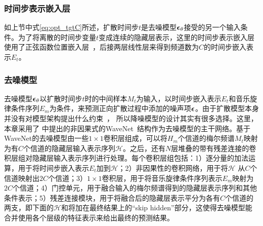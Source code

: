 \subsubsection{时间步表示嵌入层}
如上节中式\eqref{eq:opt_tgtC}所述，扩散时间步$t$是去噪模型${\boldsymbol{\epsilon}}_\theta$接受的另一个输入条件。为了将离散的时间步变量$t$变成连续的隐藏层表示，这里的时间步表示嵌入层使用了正弦函数位置嵌入层~\citep{vaswani2017attention}，后接两层线性层来得到频道数为$C$的时间步嵌入表示$E_t$。
\subsubsection{去噪模型}
去噪模型${\boldsymbol{\epsilon}}_\theta$以扩散时间步$t$时的中间样本$M_t$为输入，以时间步嵌入表示$E_t$和音乐旋律条件序列$E_m$为条件，来预测正向扩散过程中添加的噪声项${\boldsymbol{\epsilon}}$。由于扩散模型本身并没有对模型架构提出什么约束~\citep{sohl2015deep,kong2021diffwave}， 所以降噪模型的设计其实有很多选择。这里，
本章采用了\citet{rethage2018wavenet,kong2021diffwave}
中提出的非因果式的WaveNet~\citep{vanwavenet}结构作为去噪模型的主干网络。基于WaveNet的去噪模型由一些$1\times1$卷积层组成，可以将$H_m$个信道的梅尔频谱$M_t$映射为有$C$个信道的隐藏层输入表示序列$\mathcal{H}$。之后，还有$N$层堆叠的带有残差连接的卷积层组对隐藏层输入表示序列进行处理。每个卷积层组包括：1）逐分量的加法运算，用于将时间步嵌入表示$E_t$加到$\mathcal{H}$；2）非因果性的卷积网络，用于将$\mathcal{H}$ 从$C$个信道映射出$2C$个信道；3）$1\times1$卷积层，用于将音乐旋律条件序列表示$E_m$映射为$2C$个信道；4）门控单元，用于融合输入的梅尔频谱得到的隐藏层表示序列和其他条件表示；5）残差连接模块，用于将融合后的隐藏层表示平分为各有$C$个信道的两支，即下面的$\mathcal{H}$和将加在最终结果上的``skip hidden''部分，这使得去噪模型能合并使用各个层级的特征表示来给出最终的预测结果。
